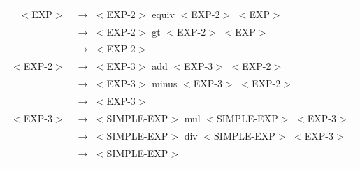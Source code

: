 \documentclass[a4paper,10pt]{article}
\begin{document}
	\begin{center}\begin{tabular}{rl}
		$<$EXP$>$			& $\rightarrow$ $<$EXP-2$>$ equiv $<$EXP-2$>$ $<$EXP$>$  \\
							& $\rightarrow$ $<$EXP-2$>$ gt $<$EXP-2$>$ $<$EXP$>$\\ 
							& $\rightarrow$ $<$EXP-2$>$ \\
					
		$<$EXP-2$>$			& $\rightarrow$ $<$EXP-3$>$ add $<$EXP-3$>$ $<$EXP-2$>$  \\
							& $\rightarrow$ $<$EXP-3$>$ minus $<$EXP-3$>$ $<$EXP-2$>$\\ 
							& $\rightarrow$ $<$EXP-3$>$ \\

		$<$EXP-3$>$			& $\rightarrow$ $<$SIMPLE-EXP$>$ mul $<$SIMPLE-EXP$>$ $<$EXP-3$>$  \\
							& $\rightarrow$ $<$SIMPLE-EXP$>$ div $<$SIMPLE-EXP$>$ $<$EXP-3$>$\\ 
							& $\rightarrow$ $<$SIMPLE-EXP$>$ \\					
	\end{tabular}\end{center}
\end{document}
